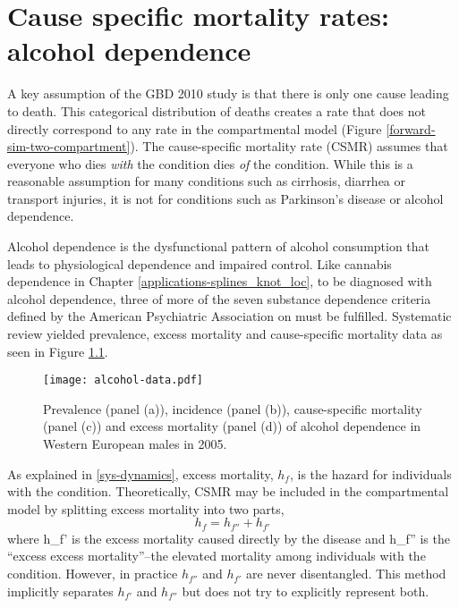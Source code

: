 \chapter{Cause specific mortality rates: alcohol dependence}
\label{applications-csmr}

A key assumption of the GBD 2010 study is that there is only one cause leading to death.  This categorical distribution of deaths creates a rate that does not directly correspond to any rate in the compartmental model (Figure \ref{forward-sim-two-compartment}).  The cause-specific mortality rate (CSMR) assumes that everyone who dies \emph{with} the condition dies \emph{of} the condition.  While this is a reasonable assumption for many conditions such as cirrhosis, diarrhea or transport injuries, it is not for conditions such as Parkinson's disease or alcohol dependence.

Alcohol dependence is the dysfunctional pattern of alcohol consumption that leads to physiological dependence and impaired control.  Like cannabis dependence in Chapter \ref{applications-splines_knot_loc}, to be diagnosed with alcohol dependence, three of more of the seven substance dependence criteria defined by the American Psychiatric Association on \pageref{tab:app-substance_dependence} must be fulfilled. \cite{american_diagnostic_2000, hasin_prevalence_2007}  Systematic review yielded prevalence, excess mortality and cause-specific mortality data as seen in Figure \ref{fig:app-alcohol data}.

    \begin{figure}[h]
        \begin{center}
            \texttt{[image: alcohol-data.pdf]}
            \caption{Prevalence (panel (a)), incidence (panel (b)), cause-specific mortality (panel (c)) and excess mortality (panel (d)) of alcohol dependence in Western European males in 2005.}
            \label{fig:app-alcohol data}
        \end{center}
    \end{figure}

As explained in \ref{sys-dynamics}, excess mortality, $h_{f}$, is the hazard for individuals with the condition.  Theoretically, CSMR may be included in the compartmental model by splitting excess mortality into two parts,
    \begin{equation}
        h_{f} = h_{f''} + h_{f'}
    \end{equation}
where h_{f'} is the excess mortality caused directly by the disease and h_{f''} is the ``excess excess mortality''--the elevated mortality among individuals with the condition.  However, in practice $h_{f''}$ and $h_{f'}$ are never disentangled.  This method implicitly separates $h_{f'}$ and $h_{f''}$ but does not try to explicitly represent both.

